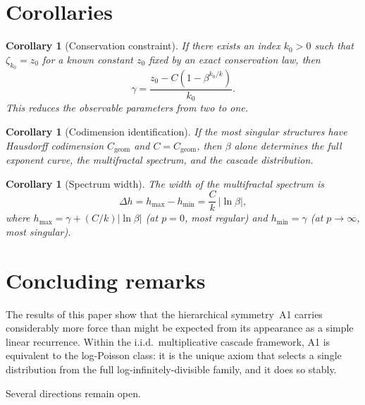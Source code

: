 \documentclass[12pt]{amsart}
\newtheorem{corollary}[theorem]{Corollary}
\theoremstyle{definition}
\theoremstyle{remark}
\begin{document}
\section{Corollaries}
\label{sec:corollaries}

\begin{corollary}[Conservation constraint]\label{cor:conservation}
If there exists an index $k_0 > 0$ such that $\zeta_{k_0} = z_0$ for
a known constant $z_0$ fixed by an exact conservation law, then
\[
  \gamma = \frac{z_0 - C(1-\beta^{k_0/k})}{k_0}.
\]
This reduces the observable parameters from two to one.
\end{corollary}

\begin{corollary}[Codimension identification]\label{cor:codimension}
If the most singular structures have Hausdorff codimension
$C_{\mathrm{geom}}$ and $C = C_{\mathrm{geom}}$, then $\beta$
alone determines the full exponent curve, the multifractal spectrum,
and the cascade distribution.
\end{corollary}

\begin{corollary}[Spectrum width]\label{cor:width}
The width of the multifractal spectrum is
\[
  \Delta h = h_{\max} - h_{\min} = \frac{C}{k}\,|\ln\beta|,
\]
where $h_{\max} = \gamma + (C/k)|\ln\beta|$ (at $p = 0$, most
regular) and $h_{\min} = \gamma$ (at $p \to \infty$, most singular).
\end{corollary}


\section{Concluding remarks}
\label{sec:discussion}

The results of this paper show that the hierarchical symmetry~A1
carries considerably more force than might be expected from its
appearance as a simple linear recurrence.  Within the i.i.d.\
multiplicative cascade framework, A1 is equivalent to the log-Poisson
class: it is the unique axiom that selects a single distribution from
the full log-infinitely-divisible family, and it does so stably.

Several directions remain open.
\end{document}
